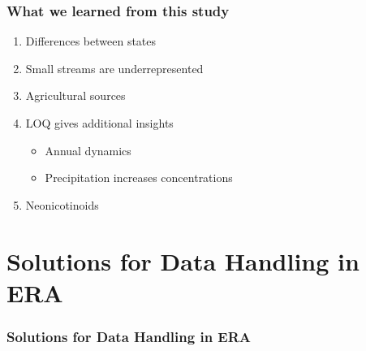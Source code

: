 \documentclass[
	10pt
	]{beamer}
\begin{document}
\begin{frame}
\frametitle{What we learned from this study}
	\begin{enumerate}
		\item Differences between \alert{states}
		\item Small streams are \alert{underrepresented}
		\item \alert{Agricultural} sources
		\item \alert{LOQ} gives additional insights
			\begin{itemize}
				\item Annual \alert{dynamics}
				\item \alert{Precipitation} increases concentrations
			\end{itemize}
		\item \alert{Neonicotinoids} 
	\end{enumerate}
\end{frame}



\section{Solutions for Data Handling in ERA}
\begin{frame}[noframenumbering]
\frametitle{Solutions for Data Handling in ERA}
 \resizebox{11.5cm}{!}{%
				
				}
\end{frame}
\end{document}

